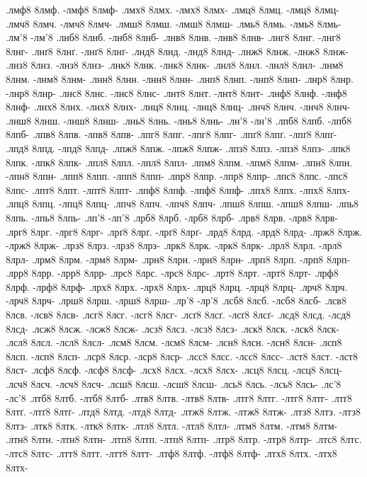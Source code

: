 {.лмф8 8лмф. -лмф8 8лмф-
.лмх8 8лмх. -лмх8 8лмх-
.лмц8 8лмц. -лмц8 8лмц-
.лмч8 8лмч. -лмч8 8лмч-
.лмш8 8лмш. -лмш8 8лмш-
.лмь8 8лмь. -лмь8 8лмь-
.лм'8 -лм'8
.лнб8 8лнб. -лнб8 8лнб-
.лнв8 8лнв. -лнв8 8лнв-
.лнг8 8лнг. -лнг8 8лнг-
.лнґ8 8лнґ. -лнґ8 8лнґ-
.лнд8 8лнд. -лнд8 8лнд-
.лнж8 8лнж. -лнж8 8лнж-
.лнз8 8лнз. -лнз8 8лнз-
.лнк8 8лнк. -лнк8 8лнк-
.лнл8 8лнл. -лнл8 8лнл-
.лнм8 8лнм. -лнм8 8лнм-
.лнн8 8лнн. -лнн8 8лнн-
.лнп8 8лнп. -лнп8 8лнп-
.лнр8 8лнр. -лнр8 8лнр-
.лнс8 8лнс. -лнс8 8лнс-
.лнт8 8лнт. -лнт8 8лнт-
.лнф8 8лнф. -лнф8 8лнф-
.лнх8 8лнх. -лнх8 8лнх-
.лнц8 8лнц. -лнц8 8лнц-
.лнч8 8лнч. -лнч8 8лнч-
.лнш8 8лнш. -лнш8 8лнш-
.лнь8 8лнь. -лнь8 8лнь-
.лн'8 -лн'8
.лпб8 8лпб. -лпб8 8лпб-
.лпв8 8лпв. -лпв8 8лпв-
.лпг8 8лпг. -лпг8 8лпг-
.лпґ8 8лпґ. -лпґ8 8лпґ-
.лпд8 8лпд. -лпд8 8лпд-
.лпж8 8лпж. -лпж8 8лпж-
.лпз8 8лпз. -лпз8 8лпз-
.лпк8 8лпк. -лпк8 8лпк-
.лпл8 8лпл. -лпл8 8лпл-
.лпм8 8лпм. -лпм8 8лпм-
.лпн8 8лпн. -лпн8 8лпн-
.лпп8 8лпп. -лпп8 8лпп-
.лпр8 8лпр. -лпр8 8лпр-
.лпс8 8лпс. -лпс8 8лпс-
.лпт8 8лпт. -лпт8 8лпт-
.лпф8 8лпф. -лпф8 8лпф-
.лпх8 8лпх. -лпх8 8лпх-
.лпц8 8лпц. -лпц8 8лпц-
.лпч8 8лпч. -лпч8 8лпч-
.лпш8 8лпш. -лпш8 8лпш-
.лпь8 8лпь. -лпь8 8лпь-
.лп'8 -лп'8
.лрб8 8лрб. -лрб8 8лрб-
.лрв8 8лрв. -лрв8 8лрв-
.лрг8 8лрг. -лрг8 8лрг-
.лрґ8 8лрґ. -лрґ8 8лрґ-
.лрд8 8лрд. -лрд8 8лрд-
.лрж8 8лрж. -лрж8 8лрж-
.лрз8 8лрз. -лрз8 8лрз-
.лрк8 8лрк. -лрк8 8лрк-
.лрл8 8лрл. -лрл8 8лрл-
.лрм8 8лрм. -лрм8 8лрм-
.лрн8 8лрн. -лрн8 8лрн-
.лрп8 8лрп. -лрп8 8лрп-
.лрр8 8лрр. -лрр8 8лрр-
.лрс8 8лрс. -лрс8 8лрс-
.лрт8 8лрт. -лрт8 8лрт-
.лрф8 8лрф. -лрф8 8лрф-
.лрх8 8лрх. -лрх8 8лрх-
.лрц8 8лрц. -лрц8 8лрц-
.лрч8 8лрч. -лрч8 8лрч-
.лрш8 8лрш. -лрш8 8лрш-
.лр'8 -лр'8
.лсб8 8лсб. -лсб8 8лсб-
.лсв8 8лсв. -лсв8 8лсв-
.лсг8 8лсг. -лсг8 8лсг-
.лсґ8 8лсґ. -лсґ8 8лсґ-
.лсд8 8лсд. -лсд8 8лсд-
.лсж8 8лсж. -лсж8 8лсж-
.лсз8 8лсз. -лсз8 8лсз-
.лск8 8лск. -лск8 8лск-
.лсл8 8лсл. -лсл8 8лсл-
.лсм8 8лсм. -лсм8 8лсм-
.лсн8 8лсн. -лсн8 8лсн-
.лсп8 8лсп. -лсп8 8лсп-
.лср8 8лср. -лср8 8лср-
.лсс8 8лсс. -лсс8 8лсс-
.лст8 8лст. -лст8 8лст-
.лсф8 8лсф. -лсф8 8лсф-
.лсх8 8лсх. -лсх8 8лсх-
.лсц8 8лсц. -лсц8 8лсц-
.лсч8 8лсч. -лсч8 8лсч-
.лсш8 8лсш. -лсш8 8лсш-
.лсь8 8лсь. -лсь8 8лсь-
.лс'8 -лс'8
.лтб8 8лтб. -лтб8 8лтб-
.лтв8 8лтв. -лтв8 8лтв-
.лтг8 8лтг. -лтг8 8лтг-
.лтґ8 8лтґ. -лтґ8 8лтґ-
.лтд8 8лтд. -лтд8 8лтд-
.лтж8 8лтж. -лтж8 8лтж-
.лтз8 8лтз. -лтз8 8лтз-
.лтк8 8лтк. -лтк8 8лтк-
.лтл8 8лтл. -лтл8 8лтл-
.лтм8 8лтм. -лтм8 8лтм-
.лтн8 8лтн. -лтн8 8лтн-
.лтп8 8лтп. -лтп8 8лтп-
.лтр8 8лтр. -лтр8 8лтр-
.лтс8 8лтс. -лтс8 8лтс-
.лтт8 8лтт. -лтт8 8лтт-
.лтф8 8лтф. -лтф8 8лтф-
.лтх8 8лтх. -лтх8 8лтх-
}
